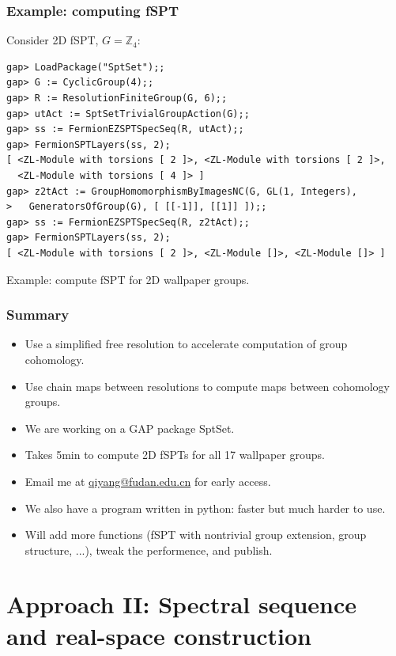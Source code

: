 \documentclass[xcolor=table, aspectratio=169,ignorenonframetext]{beamer}
\begin{document}
\begin{frame}[fragile]
	\frametitle{Example: computing fSPT}
	Consider 2D fSPT, $G=\mathbb Z_4$:
\begin{lstlisting}[basicstyle=\footnotesize]
gap> LoadPackage("SptSet");;
gap> G := CyclicGroup(4);;
gap> R := ResolutionFiniteGroup(G, 6);;
gap> utAct := SptSetTrivialGroupAction(G);;
gap> ss := FermionEZSPTSpecSeq(R, utAct);;
gap> FermionSPTLayers(ss, 2);
[ <ZL-Module with torsions [ 2 ]>, <ZL-Module with torsions [ 2 ]>,
  <ZL-Module with torsions [ 4 ]> ]
gap> z2tAct := GroupHomomorphismByImagesNC(G, GL(1, Integers),
>   GeneratorsOfGroup(G), [ [[-1]], [[1]] ]);;
gap> ss := FermionEZSPTSpecSeq(R, z2tAct);;
gap> FermionSPTLayers(ss, 2);
[ <ZL-Module with torsions [ 2 ]>, <ZL-Module []>, <ZL-Module []> ]
\end{lstlisting}

Example: compute fSPT for 2D wallpaper groups.
\end{frame}

\begin{frame}
	\frametitle{Summary}
	\begin{itemize}
		\item Use a simplified free resolution to accelerate computation of group cohomology.
		\item Use chain maps between resolutions to compute maps between cohomology groups.
		\item We are working on a GAP package SptSet.
		\item Takes 5min to compute 2D fSPTs for all 17 wallpaper groups.
		\item Email me at \url{qiyang@fudan.edu.cn} for early access.
		\item We also have a program written in python: faster but much harder to use.
		\item Will add more functions (fSPT with nontrivial group extension, group structure, ...), tweak the performence, and publish.
	\end{itemize}
\end{frame}

\section{Approach II: Spectral sequence and real-space construction}
\end{document}
